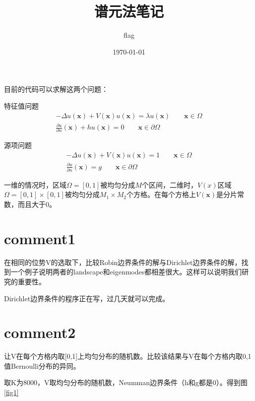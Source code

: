 \documentclass[UTF8,12pt]{article}
\title{谱元法笔记}
\author{flag}
\date{\today}
\begin{document}
    
\maketitle

目前的代码可以求解这两个问题：

特征值问题
\begin{eqnarray}
- \Delta u(\mathbf{x}) + V(\mathbf{x}) u(\mathbf{x}) = \lambda u(\mathbf{x}) \qquad \mathbf{x} \in \Omega \\
\frac{\partial u}{\partial n}(\mathbf{x}) + h u(\mathbf{x}) = 0 \qquad \mathbf{x} \in \partial \Omega
\end{eqnarray}

源项问题
\begin{eqnarray}
- \Delta u(\mathbf{x}) + V(\mathbf{x}) u(\mathbf{x}) = 1 \qquad \mathbf{x} \in \Omega \\
\frac{\partial u}{\partial n}(\mathbf{x}) = g \qquad \mathbf{x} \in \partial \Omega
\end{eqnarray}

一维的情况时，区域$\Omega=[0,1]$被均匀分成$M$个区间，二维时，$V(x)$区域$\Omega=[0,1] \times [0,1]$被均匀分成$M_1 \times M_2$个方格。在每个方格上$V(\mathbf{x})$是分片常数，而且大于0。

\section{comment1}
    
在相同的位势V的选取下，比较Robin边界条件的解与Dirichlet边界条件的解，找到一个例子说明两者的landscape和eigenmodes都相差很大。这样可以说明我们研究的重要性。

Dirichlet边界条件的程序正在写，过几天就可以完成。

\section{comment2}

让V在每个方格内取[0,1]上均匀分布的随机数。比较该结果与V在每个方格内取{0,1}值Bernoulli分布的异同。

取K为8000，V取均匀分布的随机数，Neumman边界条件（h和g都是0）。得到图\ref{fig1}
\end{document}
